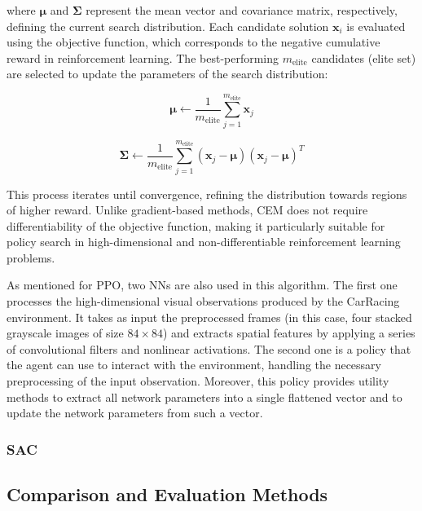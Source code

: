 \documentclass[../CSC_52081_EP.tex]{subfiles}
\begin{document}
where $\boldsymbol{\mu}$ and $\boldsymbol{\Sigma}$ represent the mean vector and covariance matrix, respectively, defining the current search distribution. Each candidate solution $\boldsymbol{x}_i$ is evaluated using the objective function, which corresponds to the negative cumulative reward in reinforcement learning. The best-performing $m_{\text{elite}}$ candidates (elite set) are selected to update the parameters of the search distribution:

\begin{equation}
\boldsymbol{\mu} \leftarrow \frac{1}{m_{\text{elite}}} \sum_{j=1}^{m_{\text{elite}}} \boldsymbol{x}_j
\end{equation}

\begin{equation}
\boldsymbol{\Sigma} \leftarrow \frac{1}{m_{\text{elite}}} \sum_{j=1}^{m_{\text{elite}}} (\boldsymbol{x}_j - \boldsymbol{\mu}) (\boldsymbol{x}_j - \boldsymbol{\mu})^T
\end{equation}

This process iterates until convergence, refining the distribution towards regions of higher reward. Unlike gradient-based methods, CEM does not require differentiability of the objective function, making it particularly suitable for policy search in high-dimensional and non-differentiable reinforcement learning problems.

As mentioned for PPO, two NNs are also used in this algorithm. The first one processes the high-dimensional visual observations produced by the CarRacing environment. It takes as input the preprocessed frames (in this case, four stacked grayscale images of size \(84 \times 84\)) and extracts spatial features by applying a series of convolutional filters and nonlinear activations. The second one is a policy that the agent can use to interact with the environment, handling the necessary preprocessing of the input observation. Moreover, this policy provides utility methods to extract all network parameters into a single flattened vector and to update the network parameters from such a vector.

\hspace{1cm}
\subsubsection{SAC}



\subsection{Comparison and Evaluation Methods}
\end{document}
